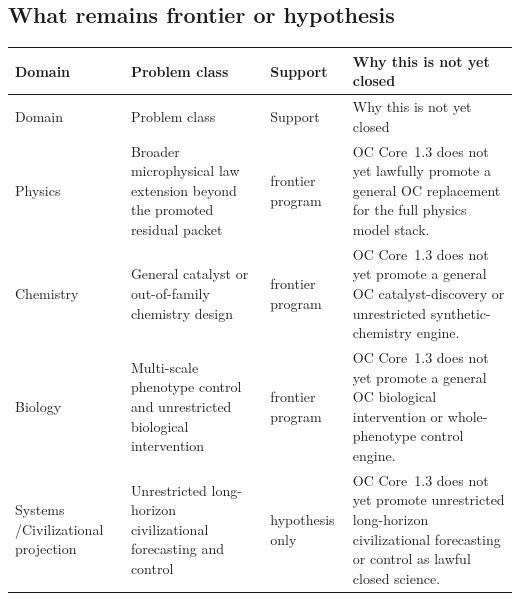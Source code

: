 \subsection{What remains frontier or hypothesis}
\begingroup
\scriptsize
\setlength{\emergencystretch}{1.5em}
\setlength{\tabcolsep}{2pt}
\setlength{\LTleft}{0pt}
\setlength{\LTright}{0pt}
\begin{longtable}{@{}L{0.11\textwidth}L{0.19\textwidth}L{0.14\textwidth}L{0.48\textwidth}@{}}
\toprule
Domain & Problem class & Support & Why this is not yet closed \\
\midrule
\endfirsthead
\toprule
Domain & Problem class & Support & Why this is not yet closed \\
\midrule
\endhead
Physics & Broader microphysical law extension beyond the promoted residual packet & frontier program & OC Core~1.3 does not yet lawfully promote a general OC replacement for the full physics model stack. \\
Chemistry & General catalyst or out-of-family chemistry design & frontier program & OC Core~1.3 does not yet promote a general OC catalyst-discovery or unrestricted synthetic-chemistry engine. \\
Biology & Multi-scale phenotype control and unrestricted biological intervention & frontier program & OC Core~1.3 does not yet promote a general OC biological intervention or whole-phenotype control engine. \\
Systems /\allowbreak Civili\allowbreak{}zational\allowbreak{} projection & Unrestricted long-horizon civilizational forecasting and control & hypothesis only & OC Core~1.3 does not yet promote unrestricted long-horizon civilizational forecasting or control as lawful closed science. \\
\bottomrule
\end{longtable}
\endgroup
